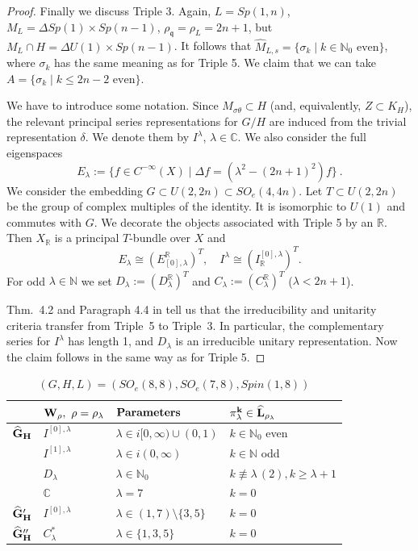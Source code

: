 \documentclass[10]{amsart}
\theoremstyle{remark}
\theoremstyle{definition}
\numberwithin{equation}{section}
\newcommand{\R}{\mathbb{R}}           %
\newcommand{\C}{\mathbb{C}}           %
\newcommand{\N}{\mathbb{N}}           %
\newcommand{\fq}{{\mathfrak q}}
\begin{document}
{\begin{proof}
Finally we discuss Triple 3. Again, $L=Sp(1,n)$, $M_L=\Delta Sp(1)\times Sp(n-1)$, $\rho_\fq=\rho_L=2n+1$, but $M_L\cap H=\Delta U(1)\times Sp(n-1)$. It follows that
$\widehat M_{L,s}=\{\sigma_k\mid k\in\N_0\mbox{ even}\}$, where $\sigma_k$ has the same meaning as for Triple 5. We claim that we can take 
$A=\{\sigma_k\mid k\le 2n-2\mbox{ even}\}$.

We have to  introduce some notation. Since $M_{\sigma\theta}\subset H$ (and, equivalently, $Z\subset K_H$), the relevant principal series representations for $G/H$ are induced from the trivial representation
$\delta$. We denote them by $I^\lambda$, $\lambda\in\C$. We also consider the full eigenspaces
$$ E_{\lambda}:=\{f\in C^{-\infty}(X)\mid \Delta f=(\lambda^2-(2n+1)^2) f\}\ .$$
We consider the embedding $G\subset U(2,2n)\subset SO_e(4,4n)$. Let $T\subset U(2,2n)$ be the group of complex multiples of the identity. It is isomorphic to $U(1)$ and commutes with $G$. We decorate the objects associated with Triple 5 by an $\R$. Then $X_\R$ is a principal $T$-bundle over $X$ and
$$  E_\lambda\cong (E_{[0],\lambda}^\R)^T ,\quad I^\lambda\cong  (I_\R^{[0],\lambda})^T .$$
For odd $\lambda\in \N$ we set $D_\lambda:=( D_\lambda^\R)^T$ and $C_\lambda:= ( C_\lambda^\R)^T$ ($\lambda<2n+1$).

Thm.~4.2 and Paragraph 4.4 in \cite{HoTa93} tell us that the irreducibility and unitarity criteria transfer from Triple~5 to Triple~3. In particular, the complementary series for $I^\lambda$
has length 1, and $D_\lambda$ is an irreducible unitary representation. Now the claim follows in the same way as for Triple 5. 
\end{proof}
\vspace*{1cm}

\setlength{\floatsep}{40pt}

\begin{table}[h]
\caption{$(G,H,L)=(SO_e(8,8),SO_e(7,8), Spin(1,8))$}\label{super}
\begin{center}
\renewcommand{\arraystretch}{1.3}
\begin{tabular}{|l||l||l||l|}
  \hline
  &${\bf W_\rho,\ \rho=\rho_\lambda}$ & ${\bf Parameters}$ & ${\bf \pi^k_\lambda\in\widehat L_{\rho_\lambda}}$\\
  \hline
    \hline
  ${\bf \widehat G_H}$& $I^{[0],\lambda}$ & $\lambda\in i[0,\infty)\cup (0,1)$ & $k\in\N_0$ even  \\
    \hline
  &$I^{[1],\lambda}$& $\lambda\in i(0,\infty)$ & $k\in \N$ odd\\
\hline
&$D_\lambda$ &$\lambda\in\N_0$&$ k\not\equiv \lambda \, (2), k\ge \lambda+1$ \\
\hline
&$\C$ &$\lambda=7$ & $ k=0$\\
   \hline
    \hline
${\bf \widehat G_H'}$&$I^{[0],\lambda}$& $\lambda\in (1,7)\setminus\{3,5\}$ & $k=0$ \\
 \hline
    \hline
${\bf \widehat G_H''}$&$C_\lambda^*$&$\lambda\in\{1,3,5\}$&$k=0$\\
\hline
\end{tabular}
\end{center}
\end{table}

}
\end{document}
